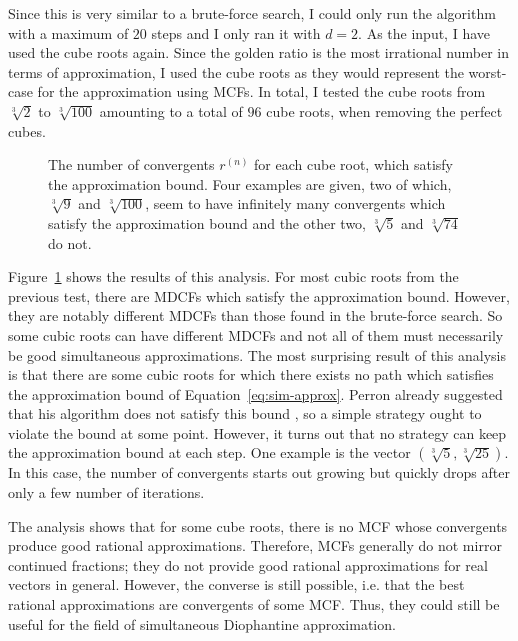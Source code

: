 Since this is very similar to a brute-force search,
I could only run the algorithm with a maximum of $20$ steps
and I only ran it with $d = 2$.
As the input, I have used the cube roots again.
Since the golden ratio is the most irrational number
in terms of approximation,
I used the cube roots as they would represent the worst-case for the
approximation using MCFs.
In total,
I tested the cube roots from $\sqrt[3]{2}$ to $\sqrt[3]{100}$ amounting to a
total of $96$ cube roots, when removing the perfect cubes.

\begin{figure}[tbp]
  \centering
  
  \caption{
    The number of convergents $r^{(n)}$ for each cube root, which
    satisfy the approximation bound.
    Four examples are given,
    two of which, $\sqrt[3]{9}$ and $\sqrt[3]{100}$, seem to have infinitely
    many convergents which satisfy the approximation bound and the other two,
    $\sqrt[3]{5}$ and $\sqrt[3]{74}$ do not.
  }
  \label{fig:results-approx}
\end{figure}

Figure~\ref{fig:results-approx} shows the results of this analysis.
For most cubic roots from the previous test,
there are MDCFs which satisfy the approximation bound.
However, they are notably different MDCFs than those found in the brute-force
search.
So some cubic roots can have different MDCFs
and not all of them must necessarily be good simultaneous approximations.
The most surprising result of this analysis is that there are some cubic roots
for which there exists no path which satisfies the approximation bound of Equation~\ref{eq:sim-approx}.
Perron already suggested that his algorithm does not satisfy this bound \cite{Perron07},
so a simple strategy ought to violate the bound at some point.
However, it turns out that no strategy can keep the approximation bound at each step.
One example is the vector $(\sqrt[3]{5}, \sqrt[3]{25})$.
In this case, the number of convergents starts out growing but quickly drops
after only a few number of iterations.



The analysis shows that for some cube roots,
there is no MCF whose convergents produce good rational approximations.
Therefore, MCFs generally do not mirror continued fractions;
they do not provide good rational approximations for real vectors in general.
However, the converse is still possible, i.e. that the best rational
approximations are convergents of some MCF.
Thus, they could still be useful for the field of simultaneous Diophantine
approximation.
